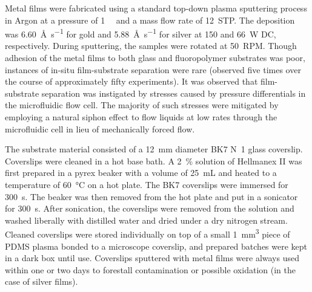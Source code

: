 Metal films were fabricated using a standard top-down plasma sputtering process
in Argon at a pressure of \SI{1}{\milli\torr} and a mass flow rate of
\SI{12}{STP}.  The deposition was \SI{6.60}{\angstrom\per\second} for gold and
\SI{5.88}{\angstrom\per\second} for silver at 150 and \SI{66}{\watt} DC,
respectively.  During sputtering, the samples were rotated at \SI{50}{RPM}.
Though adhesion of the metal films to both glass and fluoropolymer substrates
was poor, instances of in-situ film-substrate separation were rare (observed
five times over the course of approximately fifty experiments).  It was
observed that film-substrate separation was instigated by stresses caused by
pressure differentials in the microfluidic flow cell.  The majority of such
stresses were mitigated by employing a natural siphon effect to flow liquids at
low rates through the microfluidic cell in lieu of mechanically forced flow.


The substrate material consisted of a \SI{12}{\milli\meter} diameter BK7
N~1 glass coverslip.  Coverslips were
cleaned in a hot base bath.  A \SI{2}{\percent} solution of Hellmanex II was
first prepared in a pyrex beaker with a volume of \SI{25}{\milli\liter} and
heated to a temperature of \SI{60}{\celsius} on a hot plate.  The BK7
coverslips were immersed for \SI{300}{\second}.  The beaker was then removed
from the hot plate and put in a sonicator for \SI{300}{\second}.  After
sonication, the coverslips were removed from the solution and washed liberally
with distilled water and dried under a dry nitrogen stream.  Cleaned coverslips
were stored individually on top of a small \SI{1}{\milli\meter\cubed} piece of
PDMS plasma bonded to a microscope coverslip, and prepared batches were kept in
a dark box until use.  Coverslips sputtered with metal films were always used
within one or two days to forestall contamination or possible oxidation (in the
case of silver films).

